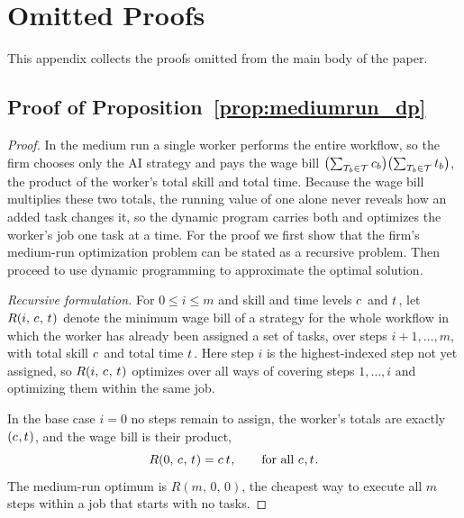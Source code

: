 \section{Omitted Proofs}
\label{app:omitted_proofs}

This appendix collects the proofs omitted from the main body of the paper.

\subsection{Proof of Proposition~\ref{prop:mediumrun_dp}}

\begin{proof}
In the medium run a single worker performs the entire workflow, so the firm chooses only the AI strategy and pays the wage bill $\bigl(\sum_{T_b \in \mathcal{T}} c_{b}\bigr)\bigl(\sum_{T_b \in \mathcal{T}} t_{b}\bigr)$, the product of the worker's total skill and total time.
Because the wage bill multiplies these two totals, the running value of one alone never reveals how an added task changes it, so the dynamic program carries both and optimizes the worker's job one task at a time.
For the proof we first show that the firm's medium-run optimization problem can be stated as a recursive problem.
Then proceed to use dynamic programming to approximate the optimal solution.

\emph{Recursive formulation.}
For $0 \le i \le m$ and skill and time levels $c_{}$ and $t_{}$, let $R(i,\, c_{},\, t_{})$ denote the minimum wage bill of a strategy for the whole workflow in which the worker has already been assigned a set of tasks, over steps $i+1, \dotsc, m$, with total skill $c_{}$ and total time $t_{}$.
Here step $i$ is the highest-indexed step not yet assigned, so $R(i,\, c_{},\, t_{})$ optimizes over all ways of covering steps $1, \dotsc, i$ and optimizing them within the same job.

In the base case $i = 0$ no steps remain to assign, the worker's totals are exactly $(c_{}, t_{})$, and the wage bill is their product,
\[
R(0,\, c_{},\, t_{}) = c_{}\,t_{}, \qquad \text{for all } c_{}, t_{}.
\]
The medium-run optimum is $R(m,\, 0,\, 0)$, the cheapest way to execute all $m$ steps within a job that starts with no tasks.


\end{proof}
